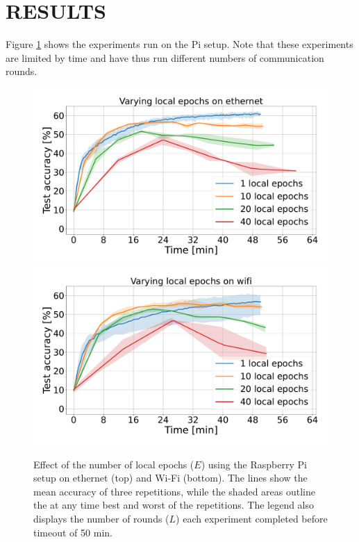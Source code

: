 \documentclass{article}
\begin{document}
\section{RESULTS}%
\label{sec:results}
Figure \ref{fig:rpi-local-epochs} shows the experiments run on the Pi setup.
Note that these experiments are limited by time and have thus run different numbers of communication rounds.
\begin{figure}[htb!]
    \centering
    \includegraphics[width=\linewidth]{imgs/time_avg_local_epochs_ethernet.pdf}
    \includegraphics[width=\linewidth]{imgs/time_avg_local_epochs_wifi.pdf}
    \caption{Effect of the number of local epochs ($E$) using the Raspberry Pi setup on ethernet (top) and Wi-Fi (bottom).
    The lines show the mean accuracy of three repetitions, while the shaded areas outline the at any time best and worst of the repetitions.
    The legend also displays the number of rounds ($L$) each experiment completed before timeout of 50 min.
}
    \label{fig:rpi-local-epochs}
\end{figure}\noindent
\end{document}
